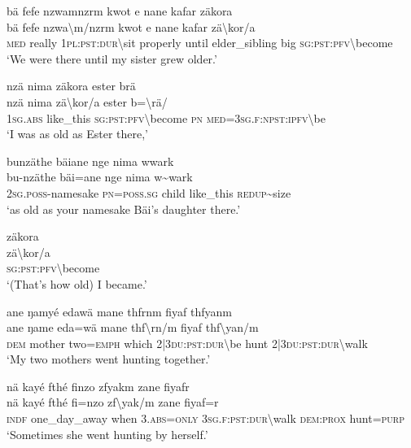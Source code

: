 \ea\label{ex:14:a3015}
bä fefe nzwamnzrm kwot e nane kafar zäkora\\
\gll bä	fefe	nzwa{\textbackslash}m/nzrm	kwot	e	nane	kafar	zä{\textbackslash}kor/a\\
     \textsc{med}	really	1\textsc{pl}:\textsc{pst}:\textsc{dur}{\textbackslash}sit	properly	until	elder\_sibling	big	\textsc{sg}:\textsc{pst}:\textsc{pfv}{\textbackslash}become\\
\glt `We were there until my sister grew older.'
\z

\ea\label{ex:14:a3017}
nzä nima zäkora ester brä\\
\gll nzä	nima	zä{\textbackslash}kor/a	ester	b={\textbackslash}rä/\\
     1\textsc{sg}.\textsc{abs}	like\_this	\textsc{sg}:\textsc{pst}:\textsc{pfv}{\textbackslash}become	\textsc{pn}	\textsc{med}=3\textsc{sg}.\textsc{f}:\textsc{npst}:\textsc{ipfv}{\textbackslash}be\\
\glt `I was as old as Ester there,'
\z

\ea\label{ex:14:a3018}
bunzäthe bäiane nge nima wwark\\
\gll bu-nzäthe	bäi=ane	nge	nima	w{\textasciitilde}wark\\
     2\textsc{sg}.\textsc{poss}-namesake	\textsc{pn}=\textsc{poss}.\textsc{sg}	child	like\_this	\textsc{redup}{\textasciitilde}size\\
\glt `as old as your namesake Bäi's daughter there.'
\z

\ea\label{ex:14:a3020}
zäkora\\
\gll zä{\textbackslash}kor/a\\
     \textsc{sg}:\textsc{pst}:\textsc{pfv}{\textbackslash}become\\
\glt `(That's how old) I became.'
\z

\ea\label{ex:14:a3021}
ane ŋamyé edawä mane thfrnm fiyaf thfyanm\\
\gll ane	ŋame	eda=wä	mane	thf{\textbackslash}rn/m	fiyaf	thf{\textbackslash}yan/m\\
     \textsc{dem}	mother	two=\textsc{emph}	which	2|3\textsc{du}:\textsc{pst}:\textsc{dur}{\textbackslash}be	hunt	2|3\textsc{du}:\textsc{pst}:\textsc{dur}{\textbackslash}walk\\
\glt `My two mothers went hunting together.'
\z

\ea\label{ex:14:a3023}
nä kayé fthé finzo zfyakm zane fiyafr\\
\gll nä	kayé	fthé	fi=nzo	zf{\textbackslash}yak/m	zane	fiyaf=r\\
     \textsc{indf}	one\_day\_away	when	3.\textsc{abs}=\textsc{only}	3\textsc{sg}.\textsc{f}:\textsc{pst}:\textsc{dur}{\textbackslash}walk	\textsc{dem}:\textsc{prox}	hunt=\textsc{purp}\\
\glt `Sometimes she went hunting by herself.'
\z

